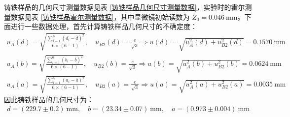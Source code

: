 \documentclass[UTF8]{article}
\theoremstyle{MyLineTheoremStyle} %
\theoremstyle{MyBlockTheoremStyle} %
\theoremstyle{MySubsubsectionStyle} %
\begin{document}
铸铁样品的几何尺寸测量数据见表 \ref{铸铁样品几何尺寸测量数据}，实验时的霍尔测量数据见表 \ref{铸铁样品霍尔测量数据}，其中显微镜初始读数为 $Z_0 = 0.046 \ \mathrm{mm}$。下面进行一些数据处理，首先计算铸铁样品几何尺寸的不确定度：
\begin{gather}
u_A(d) = \sqrt{\frac{\sum_{i=1}^{6}\left(d_i - \overline{d}\right)^2}{6\times (6 - 1)}} ,\quad u_{B2}(d) = \frac{e}{\sqrt{3}} \Longrightarrow u(d) = \sqrt{u_A^2(d) + u_{B2}^2(d)} = 0.1570 \ \mathrm{mm} \\
u_A(b) = \sqrt{\frac{\sum_{i=1}^{6}\left(b_i - \overline{b}\right)^2}{6\times (6 - 1)}} ,\quad u_{B2}(b) = \frac{e}{\sqrt{3}} \Longrightarrow u(b) = \sqrt{u_A^2(b) + u_{B2}^2(b)} = 0.0624 \ \mathrm{mm} \\ 
u_A(a) = \sqrt{\frac{\sum_{i=1}^{6}\left(a_i - \overline{a}\right)^2}{6\times (6 - 1)}} ,\quad u_{B2}(a) = \frac{e}{\sqrt{3}} \Longrightarrow u(a) = \sqrt{u_A^2(a) + u_{B2}^2(a)} = 0.0035 \ \mathrm{mm}
\end{gather}
因此铸铁样品的几何尺寸为：
\begin{gather}
    d = (229.7 \pm 0.2) \ \mathrm{mm},\quad 
    b = (23.34 \pm 0.07) \ \mathrm{mm},\quad  
    a = (0.973 \pm 0.004) \ \mathrm{mm}
\end{gather}
\end{document}
